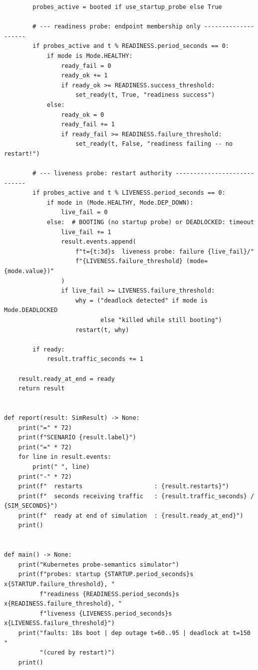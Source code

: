 \begin{verbatim}
        probes_active = booted if use_startup_probe else True

        # --- readiness probe: endpoint membership only --------------------
        if probes_active and t % READINESS.period_seconds == 0:
            if mode is Mode.HEALTHY:
                ready_fail = 0
                ready_ok += 1
                if ready_ok >= READINESS.success_threshold:
                    set_ready(t, True, "readiness success")
            else:
                ready_ok = 0
                ready_fail += 1
                if ready_fail >= READINESS.failure_threshold:
                    set_ready(t, False, "readiness failing -- no restart!")

        # --- liveness probe: restart authority ----------------------------
        if probes_active and t % LIVENESS.period_seconds == 0:
            if mode in (Mode.HEALTHY, Mode.DEP_DOWN):
                live_fail = 0
            else:  # BOOTING (no startup probe) or DEADLOCKED: timeout
                live_fail += 1
                result.events.append(
                    f"t={t:3d}s  liveness probe: failure {live_fail}/"
                    f"{LIVENESS.failure_threshold} (mode={mode.value})"
                )
                if live_fail >= LIVENESS.failure_threshold:
                    why = ("deadlock detected" if mode is Mode.DEADLOCKED
                           else "killed while still booting")
                    restart(t, why)

        if ready:
            result.traffic_seconds += 1

    result.ready_at_end = ready
    return result


def report(result: SimResult) -> None:
    print("=" * 72)
    print(f"SCENARIO {result.label}")
    print("=" * 72)
    for line in result.events:
        print(" ", line)
    print("-" * 72)
    print(f"  restarts                    : {result.restarts}")
    print(f"  seconds receiving traffic   : {result.traffic_seconds} / {SIM_SECONDS}")
    print(f"  ready at end of simulation  : {result.ready_at_end}")
    print()


def main() -> None:
    print("Kubernetes probe-semantics simulator")
    print(f"probes: startup {STARTUP.period_seconds}s x{STARTUP.failure_threshold}, "
          f"readiness {READINESS.period_seconds}s x{READINESS.failure_threshold}, "
          f"liveness {LIVENESS.period_seconds}s x{LIVENESS.failure_threshold}")
    print("faults: 18s boot | dep outage t=60..95 | deadlock at t=150 "
          "(cured by restart)")
    print()


\end{verbatim}
